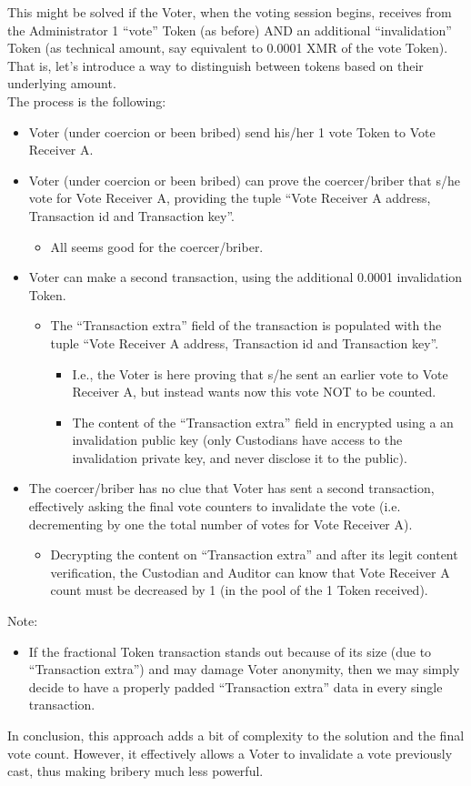 \documentclass[10pt, letterpaper]{article}
\begin{document}
This might be solved if the Voter, when the voting session begins, receives from the Administrator 1 “vote” Token (as before) AND an additional “invalidation” Token (as technical amount, say equivalent to 0.0001 XMR of the vote Token). That is, let’s introduce a way to distinguish between tokens based on their underlying amount.\\
The process is the following:
\begin{itemize}
\item Voter (under coercion or been bribed) send his/her 1 vote Token to Vote Receiver A.
\item Voter (under coercion or been bribed) can prove the coercer/briber that s/he vote for Vote Receiver A, providing the tuple “Vote Receiver A address, Transaction id and Transaction key”.
\begin{itemize}
\item All seems good for the coercer/briber.
\end{itemize}
\item Voter can make a second transaction, using the additional 0.0001 invalidation Token.
\begin{itemize}
\item The “Transaction extra” field of the transaction is populated with the tuple “Vote Receiver A address, Transaction id and Transaction key”.
\begin{itemize}
\item I.e., the Voter is here proving that s/he sent an earlier vote to Vote Receiver A, but instead wants now this vote NOT to be counted.
\item The content of the “Transaction extra” field in encrypted using a an invalidation public key (only Custodians have access to the invalidation private key, and never disclose it to the public).
\end{itemize}
\end{itemize}
\item The coercer/briber has no clue that Voter has sent a second transaction, effectively asking the final vote counters to invalidate the vote (i.e. decrementing by one the total number of votes for Vote Receiver A).
\begin{itemize}
\item Decrypting the content on “Transaction extra” and after its legit content verification, the Custodian and Auditor can know that Vote Receiver A count must be decreased by 1 (in the pool of the 1 Token received).
\end{itemize}
\end{itemize}
Note:
\begin{itemize}
\item If the fractional Token transaction stands out because of its size (due to “Transaction extra”) and may damage Voter anonymity, then we may simply decide to have a properly padded “Transaction extra” data in every single transaction.
\end{itemize}
In conclusion, this approach adds a bit of complexity to the solution and the final vote count. However, it effectively allows a Voter to invalidate a vote previously cast, thus making bribery much less powerful.
\bigskip
\end{document}
